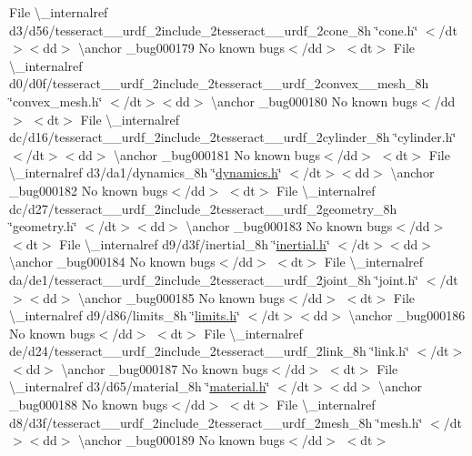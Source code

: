 \begin{DoxyRefList}
\+File \textbackslash{}\+\_\+internalref d3/d56/tesseract\+\_\+\+\_\+urdf\+\_\+2include\+\_\+2tesseract\+\_\+\+\_\+urdf\+\_\+2cone\+\_\+8h \char`\"{}cone.\+h\char`\"{} $<$/dt$>$$<$dd$>$ \textbackslash{}anchor \+\_\+bug000179 No known bugs$<$/dd$>$ $<$dt$>$
\+File \textbackslash{}\+\_\+internalref d0/d0f/tesseract\+\_\+\+\_\+urdf\+\_\+2include\+\_\+2tesseract\+\_\+\+\_\+urdf\+\_\+2convex\+\_\+\+\_\+mesh\+\_\+8h \char`\"{}convex\+\_\+mesh.\+h\char`\"{} $<$/dt$>$$<$dd$>$ \textbackslash{}anchor \+\_\+bug000180 No known bugs$<$/dd$>$ $<$dt$>$
\+File \textbackslash{}\+\_\+internalref dc/d16/tesseract\+\_\+\+\_\+urdf\+\_\+2include\+\_\+2tesseract\+\_\+\+\_\+urdf\+\_\+2cylinder\+\_\+8h \char`\"{}cylinder.\+h\char`\"{} $<$/dt$>$$<$dd$>$ \textbackslash{}anchor \+\_\+bug000181 No known bugs$<$/dd$>$ $<$dt$>$
\+File \textbackslash{}\+\_\+internalref d3/da1/dynamics\+\_\+8h \char`\"{}\mbox{\hyperlink{dynamics_8h}{dynamics.\+h}}\char`\"{} $<$/dt$>$$<$dd$>$ \textbackslash{}anchor \+\_\+bug000182 No known bugs$<$/dd$>$ $<$dt$>$
\+File \textbackslash{}\+\_\+internalref dc/d27/tesseract\+\_\+\+\_\+urdf\+\_\+2include\+\_\+2tesseract\+\_\+\+\_\+urdf\+\_\+2geometry\+\_\+8h \char`\"{}geometry.\+h\char`\"{} $<$/dt$>$$<$dd$>$ \textbackslash{}anchor \+\_\+bug000183 No known bugs$<$/dd$>$ $<$dt$>$
\+File \textbackslash{}\+\_\+internalref d9/d3f/inertial\+\_\+8h \char`\"{}\mbox{\hyperlink{inertial_8h}{inertial.\+h}}\char`\"{} $<$/dt$>$$<$dd$>$ \textbackslash{}anchor \+\_\+bug000184 No known bugs$<$/dd$>$ $<$dt$>$
\+File \textbackslash{}\+\_\+internalref da/de1/tesseract\+\_\+\+\_\+urdf\+\_\+2include\+\_\+2tesseract\+\_\+\+\_\+urdf\+\_\+2joint\+\_\+8h \char`\"{}joint.\+h\char`\"{} $<$/dt$>$$<$dd$>$ \textbackslash{}anchor \+\_\+bug000185 No known bugs$<$/dd$>$ $<$dt$>$
\+File \textbackslash{}\+\_\+internalref d9/d86/limits\+\_\+8h \char`\"{}\mbox{\hyperlink{limits_8h}{limits.\+h}}\char`\"{} $<$/dt$>$$<$dd$>$ \textbackslash{}anchor \+\_\+bug000186 No known bugs$<$/dd$>$ $<$dt$>$
\+File \textbackslash{}\+\_\+internalref de/d24/tesseract\+\_\+\+\_\+urdf\+\_\+2include\+\_\+2tesseract\+\_\+\+\_\+urdf\+\_\+2link\+\_\+8h \char`\"{}link.\+h\char`\"{} $<$/dt$>$$<$dd$>$ \textbackslash{}anchor \+\_\+bug000187 No known bugs$<$/dd$>$ $<$dt$>$
\+File \textbackslash{}\+\_\+internalref d3/d65/material\+\_\+8h \char`\"{}\mbox{\hyperlink{material_8h}{material.\+h}}\char`\"{} $<$/dt$>$$<$dd$>$ \textbackslash{}anchor \+\_\+bug000188 No known bugs$<$/dd$>$ $<$dt$>$
\+File \textbackslash{}\+\_\+internalref d8/d3f/tesseract\+\_\+\+\_\+urdf\+\_\+2include\+\_\+2tesseract\+\_\+\+\_\+urdf\+\_\+2mesh\+\_\+8h \char`\"{}mesh.\+h\char`\"{} $<$/dt$>$$<$dd$>$ \textbackslash{}anchor \+\_\+bug000189 No known bugs$<$/dd$>$ $<$dt$>$
$$
\end{DoxyRefList}
